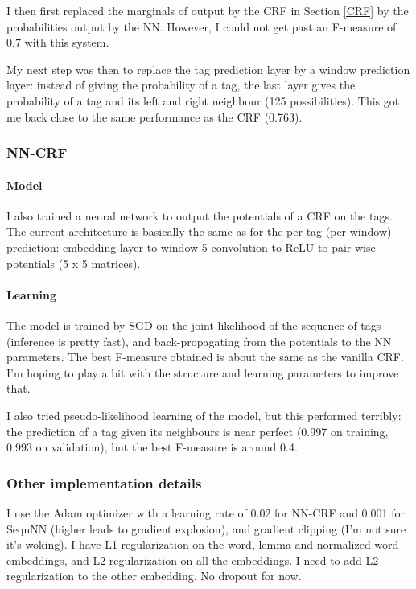 \documentclass[10pt,a4paper]{article}
\begin{document}
  I then first replaced the marginals of output by the CRF in Section \ref{CRF} by the probabilities output by the NN. However, I could not get past an F-measure of 0.7 with this system.
  
  My next step was then to replace the tag prediction layer by a window prediction layer: instead of giving the probability of a tag, the last layer gives the probability of a tag and its left and right neighbour (125 possibilities). This got me back close to the same performance as the CRF (0.763).

\subsubsection{NN-CRF}

  \paragraph{Model}

  I also trained a neural network to output the potentials of a CRF on the tags. The current architecture is basically the same as for the per-tag (per-window) prediction: embedding layer to window 5 convolution to ReLU to pair-wise potentials (5 x 5 matrices).

  \paragraph{Learning} The model is trained by SGD on the joint likelihood of the sequence of tags (inference is pretty fast), and back-propagating from the potentials to the NN parameters. The best F-measure obtained is about the same as the vanilla CRF. I'm hoping to play a bit with the structure and learning parameters to improve that.
  
  I also tried pseudo-likelihood learning of the model, but this performed terribly: the prediction of a tag given its neighbours is near perfect (0.997 on training, 0.993 on validation), but the best F-measure is around 0.4.

\subsubsection{Other implementation details}

I use the Adam optimizer with a learning rate of 0.02 for NN-CRF and 0.001 for SequNN (higher leads to gradient explosion), and gradient clipping (I'm not sure it's woking). I have L1 regularization on the word, lemma and normalized word embeddings, and L2 regularization on all the embeddings. I need to add L2 regularization to the other embedding. No dropout for now.
\end{document}
